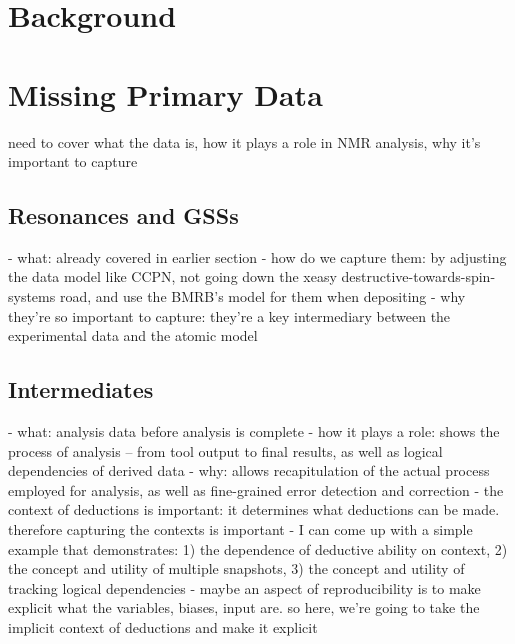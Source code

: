 \section{Background}


\section{Missing Primary Data}
need to cover what the data is, how it plays a role in NMR analysis, 
why it's important to capture

\subsection{Resonances and GSSs}
 - what: already covered in earlier section
 - how do we capture them: by adjusting the data model like CCPN, not going
   down the xeasy destructive-towards-spin-systems road, and use the BMRB's
   model for them when depositing
 - why they're so important to capture: they're a key intermediary between
   the experimental data and the atomic model

\subsection{Intermediates}
 - what: analysis data before analysis is complete
 - how it plays a role: shows the process of analysis -- from tool output to
   final results, as well as logical dependencies of derived data
 - why: allows recapitulation of the actual process employed for analysis,
   as well as fine-grained error detection and correction
 - the context of deductions is important: it determines what deductions
   can be made.  therefore capturing the contexts is important
 - I can come up with a simple example that demonstrates: 1) the dependence of
   deductive ability on context, 2) the concept and utility of multiple 
   snapshots, 3) the concept and utility of tracking logical dependencies
 - maybe an aspect of reproducibility is to make explicit what the variables,
   biases, input are.  so here, we're going to take the implicit context of
   deductions and make it explicit


